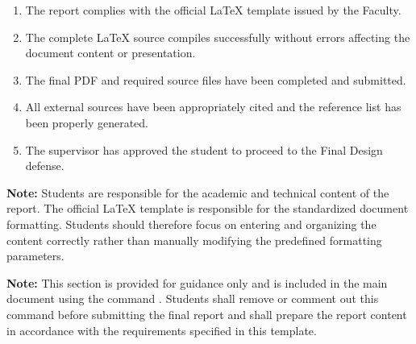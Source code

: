 {\begin{enumerate}[label=\arabic*., leftmargin=1.2cm, itemsep=2pt]
    \item The report complies with the official \LaTeX{} template
    issued by the Faculty.

    \item The complete \LaTeX{} source compiles successfully without
    errors affecting the document content or presentation.

    \item The final PDF and required source files have been completed
    and submitted.

    \item All external sources have been appropriately cited and the
    reference list has been properly generated.

    \item The supervisor has approved the student to proceed to the
    Final Design defense.

\end{enumerate}

\vspace{0.4cm}

\noindent
\textbf{Note:}
Students are responsible for the academic and technical content of
the report. The official \LaTeX{} template is responsible for the
standardized document formatting. Students should therefore focus
on entering and organizing the content correctly rather than
manually modifying the predefined formatting parameters. 

\noindent
\textbf{Note:}
This section is provided for guidance only and is included in the main
document using the command \verb||.
Students shall remove or comment out this command before submitting the
final report and shall prepare the report content in accordance with the
requirements specified in this template.


} %

\clearpage
